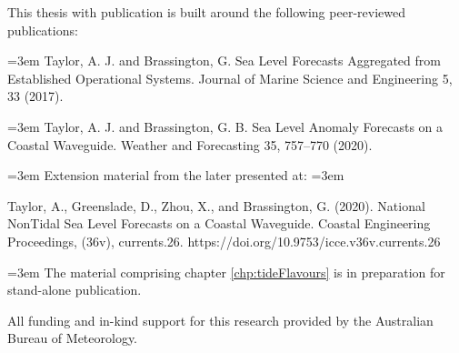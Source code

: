 
\begin{preface}

This thesis with publication is built around the following peer-reviewed publications:

\vspace{5mm}
\hangindent=3em
Taylor, A. J. and Brassington, G. Sea Level Forecasts Aggregated from Established Operational Systems. Journal of Marine Science and Engineering 5, 33 (2017).



\vspace{5mm}
\hangindent=3em
Taylor, A. J. and Brassington, G. B. Sea Level Anomaly Forecasts on a Coastal Waveguide. Weather and Forecasting 35, 757–770 (2020).

\vspace{5mm}
\hangindent=3em
Extension material from the later presented at:
\vspace{5mm}
\hangindent=3em

Taylor, A., Greenslade, D., Zhou, X., and Brassington, G. (2020). National NonTidal Sea Level Forecasts on a Coastal Waveguide. Coastal Engineering Proceedings, (36v), currents.26. https://doi.org/10.9753/icce.v36v.currents.26

\vspace{5mm}
\hangindent=3em
The material comprising chapter \ref{chp:tideFlavours} is in preparation for stand-alone publication.

\vspace{5mm}
\noindent  All funding and in-kind support for this research provided by the Australian Bureau of Meteorology. 

\end{preface}

